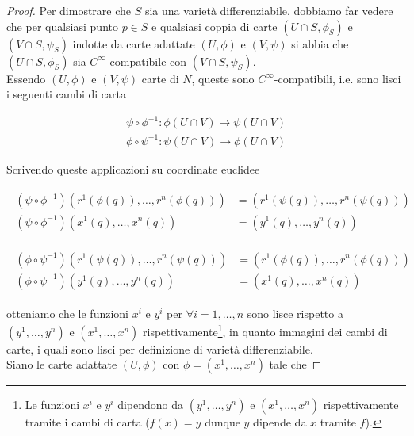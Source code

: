 \begin{proof}
	Per dimostrare che $ S $ sia una varietà differenziabile, dobbiamo far vedere che per qualsiasi punto $ p \in S $ e qualsiasi coppia di carte $ (U \cap S,\phi_{S}) $ e $ (V \cap S,\psi_{S}) $ indotte da carte adattate $ (U,\phi) $ e $ (V,\psi) $ si abbia che $ (U \cap S,\phi_{S}) $ sia $ C^{\infty} $-compatibile con $ (V \cap S,\psi_{S}) $.\\
	Essendo $ (U,\phi) $ e $ (V,\psi) $ carte di $ N $, queste sono $ C^{\infty} $-compatibili, i.e. sono lisci i seguenti cambi di carta
	
	\begin{gather}
		\psi \circ \phi^{-1} : \phi(U \cap V) \to \psi(U \cap V)\\
		\phi \circ \psi^{-1} : \psi(U \cap V) \to \phi(U \cap V)
	\end{gather}

	Scrivendo queste applicazioni su coordinate euclidee
	
	\begin{align}
		\begin{split}
			(\psi \circ \phi^{-1}) \left( r^{1}(\phi(q)),\dots,r^{n}(\phi(q)) \right) &= \left( r^{1}(\psi(q)),\dots,r^{n}(\psi(q)) \right)\\
			(\psi \circ \phi^{-1}) \left( x^{1}(q),\dots,x^{n}(q) \right) &= \left( y^{1}(q),\dots,y^{n}(q) \right)
		\end{split}
	\end{align}

	\begin{align}
		\begin{split}
			(\phi \circ \psi^{-1}) \left( r^{1}(\psi(q)),\dots,r^{n}(\psi(q)) \right) &= \left( r^{1}(\phi(q)),\dots,r^{n}(\phi(q)) \right)\\
			(\phi \circ \psi^{-1}) \left( y^{1}(q),\dots,y^{n}(q) \right) &= \left( x^{1}(q),\dots,x^{n}(q) \right)
		\end{split}
	\end{align}

	otteniamo che le funzioni $ x^{i} $ e $ y^{i} $ per $ \forall i=1,\dots,n $ sono lisce rispetto a $ (y^{1},\dots,y^{n}) $ e $ (x^{1},\dots,x^{n}) $ rispettivamente\footnote{%
		Le funzioni $ x^{i} $ e $ y^{i} $ dipendono da $ (y^{1},\dots,y^{n}) $ e $ (x^{1},\dots,x^{n}) $ rispettivamente tramite i cambi di carta ($ f(x) = y $ dunque $ y $ dipende da $ x $ tramite $ f $).%
	}, in quanto immagini dei cambi di carte, i quali sono lisci per definizione di varietà differenziabile.\\
	Siano le carte adattate $ (U,\phi) $ con $ \phi = (x^{1},\dots,x^{n}) $ tale che
	

\end{proof}
